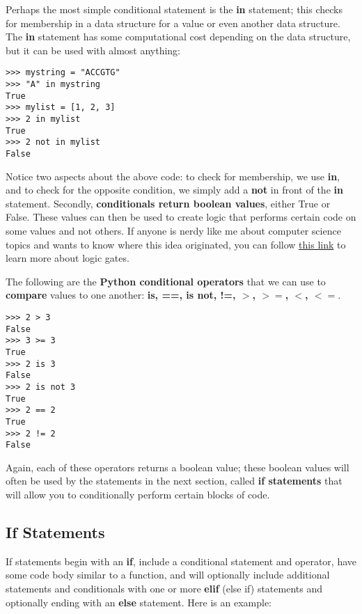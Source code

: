 \documentclass[a4paper,11pt]{article}
\begin{document}
Perhaps the most simple conditional statement is the \textbf{in} statement; this checks for membership 
in a data structure for a value or even another data structure.  The \textbf{in} statement has 
some computational cost depending on the data structure, but it can be used with almost anything:

\vspace{3mm}
\begin{lstlisting}
>>> mystring = "ACCGTG"
>>> "A" in mystring
True
>>> mylist = [1, 2, 3]
>>> 2 in mylist
True
>>> 2 not in mylist
False
\end{lstlisting}
\vspace{3mm}

Notice two aspects about the above code: to check for membership, we use \textbf{in}, and to check for the 
opposite condition, we simply add a \textbf{not} in front of the \textbf{in} statement.  Secondly, 
\textbf{conditionals return boolean values}, either True or False.  These values can then be used to 
create logic that performs certain code on some values and not others.  If anyone is nerdy like me 
about computer science topics and wants to know where this idea originated, you can follow 
\href{https://en.wikipedia.org/wiki/Logic_gate}{this link} to learn more about logic gates. \par

The following are the \textbf{Python conditional operators} that we can use to \textbf{compare} 
values to one another: \textbf{is, ==, is not, !=, $>$, $>=$, $<$, $<=$}.

\vspace{3mm}
\begin{lstlisting}
>>> 2 > 3
False
>>> 3 >= 3
True
>>> 2 is 3
False
>>> 2 is not 3
True
>>> 2 == 2
True
>>> 2 != 2
False
\end{lstlisting}
\vspace{3mm}

Again, each of these operators returns a boolean value; these boolean values will often be used 
by the statements in the next section, called \textbf{if statements} that will allow you to 
conditionally perform certain blocks of code.

\pagebreak
\subsection{If Statements}
If statements begin with an \textbf{if}, include a conditional statement and operator, have some code body 
similar to a function, and will optionally include additional statements and conditionals with one or more 
\textbf{elif} (else if) statements and optionally ending with an \textbf{else} statement.  Here is an example:
\end{document}
